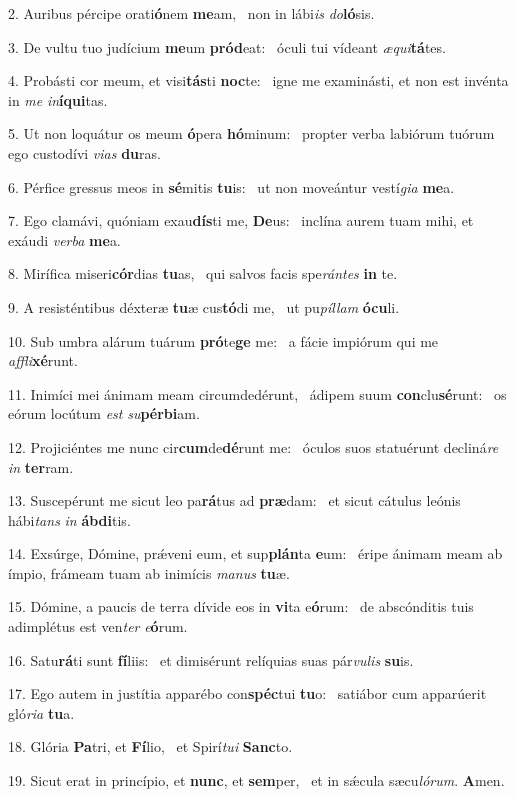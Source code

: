 2. Auribus pércipe orati\textbf{ó}nem \textbf{me}am, \ast\  non in lábi\textit{is} \textit{do}\textbf{ló}sis.\

3. De vultu tuo judícium \textbf{me}um \textbf{pród}eat: \ast\  óculi tui vídeant \textit{æ}\textit{qui}\textbf{tá}tes.\

4. Probásti cor meum, et visi\textbf{tás}ti \textbf{noc}te: \ast\  igne me examinásti, et non est invénta in \textit{me} \textit{in}\textbf{í}\textbf{qui}tas.\

5. Ut non loquátur os meum \textbf{ó}pera \textbf{hó}minum: \ast\  propter verba labiórum tuórum ego custodívi \textit{vi}\textit{as} \textbf{du}ras.\

6. Pérfice gressus meos in \textbf{sé}mitis \textbf{tu}is: \ast\  ut non moveántur vestí\textit{gi}\textit{a} \textbf{me}a.\

7. Ego clamávi, quóniam exau\textbf{dís}ti me, \textbf{De}us: \ast\  inclína aurem tuam mihi, et exáudi \textit{ver}\textit{ba} \textbf{me}a.\

8. Mirífica miseri\textbf{cór}dias \textbf{tu}as, \ast\  qui salvos facis spe\textit{rán}\textit{tes} \textbf{in} te.\

9. A resisténtibus déxteræ \textbf{tu}æ cus\textbf{tó}di me, \ast\  ut pu\textit{píl}\textit{lam} \textbf{ó}\textbf{cu}li.\

10. Sub umbra alárum tuárum \textbf{pró}te\textbf{ge} me: \ast\  a fácie impiórum qui me \textit{af}\textit{fli}\textbf{xé}runt.\

11. Inimíci mei ánimam meam circumdedérunt, \dag\  ádipem suum \textbf{con}clu\textbf{sé}runt: \ast\  os eórum locútum \textit{est} \textit{su}\textbf{pér}\textbf{bi}am.\

12. Projiciéntes me nunc cir\textbf{cum}de\textbf{dé}runt me: \ast\  óculos suos statuérunt decliná\textit{re} \textit{in} \textbf{ter}ram.\

13. Suscepérunt me sicut leo pa\textbf{rá}tus ad \textbf{præ}dam: \ast\  et sicut cátulus leónis hábi\textit{tans} \textit{in} \textbf{áb}\textbf{di}tis.\

14. Exsúrge, Dómine, prǽveni eum, et sup\textbf{plán}ta \textbf{e}um: \ast\  éripe ánimam meam ab ímpio, frámeam tuam ab inimícis \textit{ma}\textit{nus} \textbf{tu}æ.\

15. Dómine, a paucis de terra dívide eos in \textbf{vi}ta e\textbf{ó}rum: \ast\  de abscónditis tuis adimplétus est ven\textit{ter} \textit{e}\textbf{ó}rum.\

16. Satu\textbf{rá}ti sunt \textbf{fí}liis: \ast\  et dimisérunt relíquias suas pár\textit{vu}\textit{lis} \textbf{su}is.\

17. Ego autem in justítia apparébo con\textbf{spéc}tui \textbf{tu}o: \ast\  satiábor cum apparúerit gló\textit{ri}\textit{a} \textbf{tu}a.\

18. Glória \textbf{Pa}tri, et \textbf{Fí}lio, \ast\  et Spirí\textit{tu}\textit{i} \textbf{Sanc}to.\

19. Sicut erat in princípio, et \textbf{nunc}, et \textbf{sem}per, \ast\  et in sǽcula sæcu\textit{ló}\textit{rum}. \textbf{A}men.\

